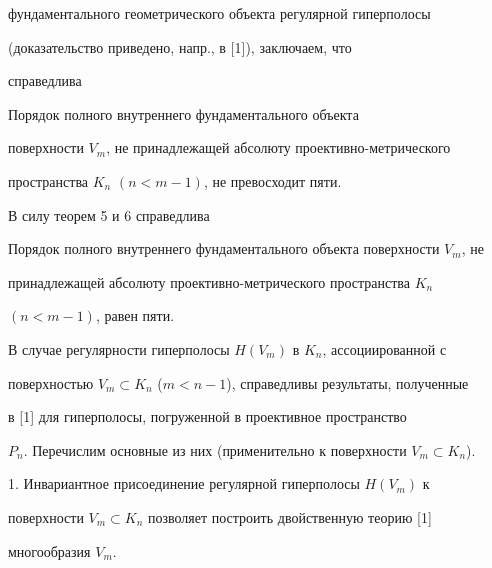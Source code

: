 фундаментального геометрического объекта регулярной гиперполосы 


(доказательство приведено, напр., в [1]), заключаем, что 


справедлива 


 


\begin{thm} 


Порядок полного внутреннего фундаментального объекта 


поверхности $V_m$, не принадлежащей абсолюту проективно-метрического 


пространства $K_n$ $(n<m-1)$, не превосходит пяти. 


\end{thm} 


 


В силу теорем 5 и 6 справедлива 


 


\begin{thm} 


Порядок полного внутреннего фундаментального объекта поверхности $V_m$, не 


принадлежащей абсолюту проективно-метрического пространства $K_n$ 


$(n<m-1)$, равен пяти. 


\end{thm} 


 


В случае регулярности гиперполосы $H(V_m)$ в $K_n$, ассоциированной с 


поверхностью $V_m\subset K_n$ ($m<n-1$), справедливы результаты, полученные 


в [1] для гиперполосы, погруженной в проективное пространство 


$P_n$. Перечислим основные из них (применительно к поверхности $V_m\subset 


K_n$). 


 


1. Инвариантное присоединение регулярной гиперполосы $H(V_m)$ к 


поверхности $V_m\subset K_n$ позволяет построить двойственную теорию [1] 


многообразия $V_m$. 


 



